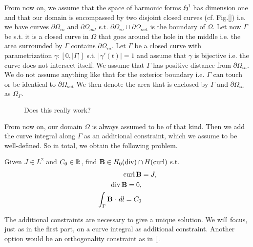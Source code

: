 \documentclass[../master_thesis.tex]{subfiles}
\begin{document}
From now on, we assume that the space of harmonic forms $\mathfrak{H}^1$ has dimension 
one and that our domain is encompassed by two disjoint closed curves (cf. Fig.\ref{})
i.e. we have curves $\partial \Omega_{in}$ and $\partial \Omega_{out}$ s.t. 
$\partial \Omega_{in} \cup \partial\Omega_{out}$ is the boundary of $\Omega$. 
Let now $\Gamma$ be s.t. it is a closed curve in $\Omega$ that goes around the 
hole in the middle i.e. the area surrounded by $\Gamma$ contains $\partial \Omega_{in}$.
Let $\Gamma$ be a closed curve with parametrization $\gamma:[0,|\Gamma|]$ s.t. 
$|\gamma'(t)| = 1$ and assume that $\gamma$ is bijective i.e. the curve does not 
intersect itself. We assume that $\Gamma$ has positive distance from 
$\partial \Omega_{in}$. We do not assume anything like that for the exterior boundary 
i.e. $\Gamma$ can touch or be identical to $\partial \Omega_{out}$ 
We then denote the area that is enclosed by $\Gamma$ and
$\partial\Omega_{in}$ as $\Omega_\Gamma$. 

\begin{figure}
    \centering
\caption{Does this really work?} \label{fig:annulus_domain}
\end{figure}

From now on, our domain $\Omega$ is always assumed to be of that kind. 
Then we add the curve integral along $\Gamma$ as an additional constraint, which we 
assume to be well-defined.
So in total, we obtain the following problem.

\begin{problem}
    Given $J \in L^2$ and $C_0 \in \mathbb{R}$, find $\mathbf{B} \in H_0(\operatorname{div}) \cap H(\operatorname{curl})$ s.t.
    \begin{align*}
        \operatorname{curl} \mathbf{B} &= J,
        \\ \operatorname{div} \mathbf{B} = 0,
        \\ \int_\Gamma \mathbf{B} \cdot \, dl = C_0
    \end{align*}
\end{problem}
The additional constraints are necessary to give a unique solution. 
We will focus, just as in the first part, on 
a curve integral as additional constraint. 
Another option would be an orthogonality constraint as in \ref{}.
\end{document}
